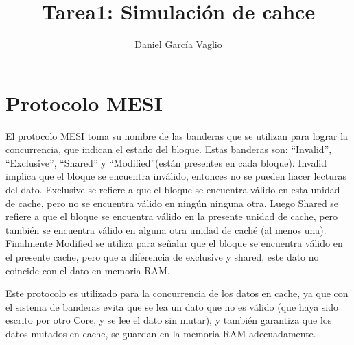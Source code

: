 \documentclass {article}
\begin{document}
\title{Tarea1: Simulación de cahce}
\author{Daniel García Vaglio}
\maketitle



\section{Protocolo MESI}
El protocolo MESI toma su nombre de las banderas que se utilizan para lograr la concurrencia, que
indican el estado del bloque. Estas banderas son: ``Invalid'', ``Exclusive'', ``Shared'' y
``Modified''(están presentes en cada bloque). Invalid implica que el bloque se encuentra inválido, entonces no se pueden hacer
lecturas del dato. Exclusive se refiere a que el bloque se encuentra válido en esta unidad de cache,
pero no se encuentra válido en ningún ninguna otra. Luego Shared se refiere a que el bloque se
encuentra válido en la presente unidad de cache, pero también se encuentra válido en alguna otra
unidad de caché (al menos una). Finalmente Modified se utiliza para señalar que el bloque se
encuentra válido en el presente cache, pero que a diferencia de exclusive y shared, este dato no
coincide con el dato en memoria RAM.

Este protocolo es utilizado para la concurrencia de los datos en cache, ya que con el sistema de
banderas evita que se lea un dato que no es válido (que haya sido escrito por otro Core, y se lee el
dato sin mutar), y también garantiza que los datos mutados en cache, se guardan en la memoria RAM
adecuadamente.
\end{document}
